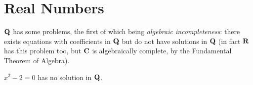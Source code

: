 \begin{comment}
\begin{notation}
Since the additive inverse is unique, we denote the additive inverse of $q\in\QQ$ by $-q$; we define the binary operation $-_\QQ$ on $\QQ$ by
\[q-_\QQ r=q+_\QQ(-r).\]
\end{notation}

\begin{notation}
Since the multiplicative inverse is unique, we denote the additive inverse of $q\in\QQ$ by $q^{-1}$.
\end{notation}

Finally we want to define an order relation on $\QQ$.
\begin{definition}[Order on $\QQ$]
Suppose that $r,s\in\QQ$ and that $r=[(a,b)]$ and $s=[(c,d)]$, where $b,d>0$. Then
\[r\le_\QQ s\iff ad<bc.\]
\end{definition}

\begin{proposition}
$<_\QQ$ is well-defined.
\end{proposition}

\begin{definition}
If $q\in\QQ$, then
\begin{itemize}
\item $q$ is \vocab{positive} if and only if $0_\QQ<_\QQ q$,
\item $q$ is \vocab{negative} if and only if $q<_\QQ0_\QQ$.
\end{itemize}
\end{definition}

\begin{definition}
If $q\in\QQ$, then the \vocab{absolute value} of $q$ is
\[|q|=\begin{cases}
-q&\text{if $q$ is negative,}\\
q&\text{if otherwise.}
\end{cases}\]
\end{definition}
\pagebreak
\end{comment}

\section{Real Numbers}
$\mathbf Q$ has some problems, the first of which being \emph{algebraic incompleteness}: there exists equations with coefficients in $\mathbf Q$ but do not have solutions in $\mathbf Q$ (in fact $\mathbf R$ has this problem too, but $\mathbf C$ is algebraically complete, by the Fundamental Theorem of Algebra).

\begin{lemma}
$x^2-2=0$ has no solution in $\mathbf Q$.
\end{lemma}

